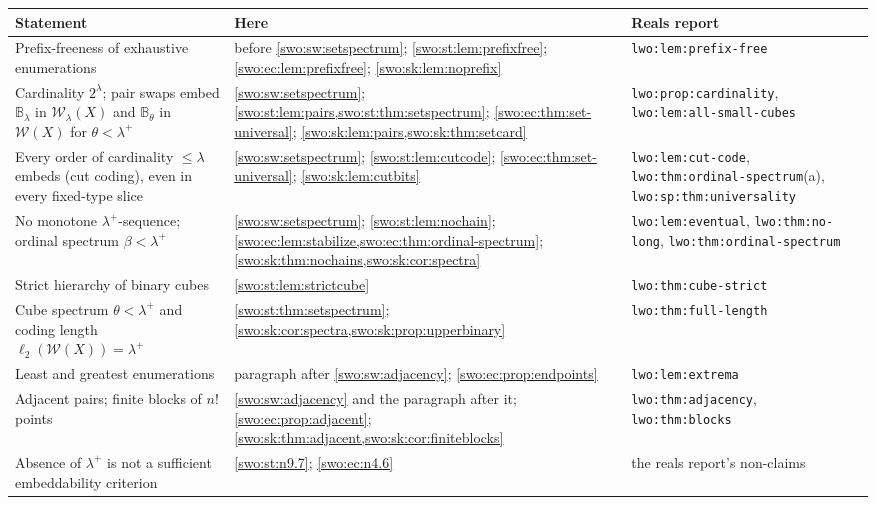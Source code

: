 \documentclass[11pt]{article}
\theoremstyle{definition}
\theoremstyle{remark}
\newcommand{\WO}{\mathcal W}
\newcommand{\B}{\mathbb B}
\newcommand{\bl}{\ell_2}
\newcommand{\code}[1]{\texttt{\small #1}}
\begin{document}
\begingroup\small
\begin{longtable}{@{}>{\raggedright\arraybackslash}p{}>{\raggedright\arraybackslash}p{}>{\raggedright\arraybackslash}p{}@{}}
\toprule
Statement & Here & Reals report\\
\midrule\endhead
Prefix-freeness of exhaustive enumerations &
before \cref{swo:sw:setspectrum}; \cref{swo:st:lem:prefixfree};
\cref{swo:ec:lem:prefixfree}; \cref{swo:sk:lem:noprefix} &
\code{lwo:lem:prefix-free}\\[2pt]
Cardinality $2^\lambda$; pair swaps embed $\B_\lambda$ in $\WO_\lambda(X)$
and $\B_\theta$ in $\WO(X)$ for $\theta<\lambda^+$ &
\cref{swo:sw:setspectrum}; \cref{swo:st:lem:pairs,swo:st:thm:setspectrum};
\cref{swo:ec:thm:set-universal}; \cref{swo:sk:lem:pairs,swo:sk:thm:setcard} &
\code{lwo:prop:cardinality}, \code{lwo:lem:all-small-cubes}\\[2pt]
Every order of cardinality $\le\lambda$ embeds (cut coding), even in every
fixed-type slice &
\cref{swo:sw:setspectrum}; \cref{swo:st:lem:cutcode};
\cref{swo:ec:thm:set-universal}; \cref{swo:sk:lem:cutbits} &
\code{lwo:lem:cut-code}, \code{lwo:thm:ordinal-spectrum}(a),
\code{lwo:sp:thm:universality}\\[2pt]
No monotone $\lambda^+$-sequence; ordinal spectrum $\beta<\lambda^+$ &
\cref{swo:sw:setspectrum}; \cref{swo:st:lem:nochain};
\cref{swo:ec:lem:stabilize,swo:ec:thm:ordinal-spectrum};
\cref{swo:sk:thm:nochains,swo:sk:cor:spectra} &
\code{lwo:lem:eventual}, \code{lwo:thm:no-long},
\code{lwo:thm:ordinal-spectrum}\\[2pt]
Strict hierarchy of binary cubes & \cref{swo:st:lem:strictcube} &
\code{lwo:thm:cube-strict}\\[2pt]
Cube spectrum $\theta<\lambda^+$ and coding length $\bl(\WO(X))=\lambda^+$ &
\cref{swo:st:thm:setspectrum}; \cref{swo:sk:cor:spectra,swo:sk:prop:upperbinary} &
\code{lwo:thm:full-length}\\[2pt]
Least and greatest enumerations &
paragraph after \cref{swo:sw:adjacency}; \cref{swo:ec:prop:endpoints} &
\code{lwo:lem:extrema}\\[2pt]
Adjacent pairs; finite blocks of $n!$ points &
\cref{swo:sw:adjacency} and the paragraph after it;
\cref{swo:ec:prop:adjacent}; \cref{swo:sk:thm:adjacent,swo:sk:cor:finiteblocks} &
\code{lwo:thm:adjacency}, \code{lwo:thm:blocks}\\[2pt]
Absence of $\lambda^+$ is not a sufficient embeddability criterion &
\cref{swo:st:n9.7}; \cref{swo:ec:n4.6} & the reals report's non-claims\\
\bottomrule
\end{longtable}
\endgroup
\end{document}
